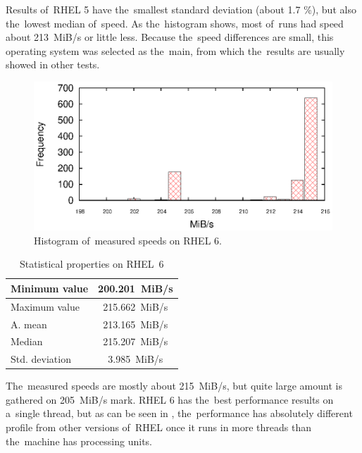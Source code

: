\par{
Results of~RHEL 5 have the~smallest standard deviation (about 1.7 \%), but also the~lowest median of~speed. As the~histogram shows, most of~runs had speed about 213~MiB/s or little less. Because the~speed differences are small, this operating system was selected as the~main, from which the~results are usually showed in other tests.
}

\begin{figure}[h!]
  \centering
 \includegraphics[width=12cm]{fig/tests/scattering_rhel6.eps} %
\caption{Histogram of~measured speeds on RHEL 6.}
\label{fig:testing:stability-r6}
\end{figure}

\begin{table}[h!]
\begin{center}
\begin{tabular}{|l|c|}
  \hline
  Minimum value& 200.201~MiB/s\\
  \hline
  Maximum value& 215.662~MiB/s\\ 
  \hline
  A. mean & 213.165~MiB/s\\
  \hline
  Median & 215.207~MiB/s\\
  \hline
  Std. deviation & 3.985~MiB/s \\
  \hline
\end{tabular}
\caption{Statistical properties on RHEL~6}
\label{tab:testing:stability-stat-r6}
\end{center}
\end{table}

\par{
The~measured speeds are mostly about 215~MiB/s, but quite large amount is gathered on 205~MiB/s mark. RHEL 6 has the~best performance results on a~single thread, but as can be seen in , the~performance has absolutely different profile from other versions of~RHEL once it runs in more threads than the~machine has processing units.
}

